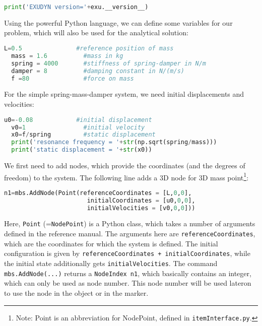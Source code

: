 \begin{lstlisting}[language=Python, firstnumber=8]
  print('EXUDYN version='+exu.__version__)
\end{lstlisting}
%
Using the powerful Python language, we can define some variables for our problem, which will also be used for the analytical solution:
\begin{lstlisting}[language=Python, firstnumber=9]
  L=0.5               #reference position of mass
  mass = 1.6          #mass in kg
  spring = 4000       #stiffness of spring-damper in N/m
  damper = 8          #damping constant in N/(m/s)
  f =80               #force on mass
\end{lstlisting}
%
For the simple spring-mass-damper system, we need initial displacements and velocities:
\begin{lstlisting}[language=Python, firstnumber=14]
  u0=-0.08            #initial displacement
  v0=1                #initial velocity
  x0=f/spring         #static displacement
  print('resonance frequency = '+str(np.sqrt(spring/mass)))
  print('static displacement = '+str(x0))
\end{lstlisting}
%
We first need to add nodes, which provide the coordinates (and the degrees of freedom) to the system.
The following line adds a 3D node for 3D mass point\footnote{Note: Point is an abbreviation for NodePoint, defined in \texttt{itemInterface.py}.}:
\begin{lstlisting}[language=Python, firstnumber=19]
  n1=mbs.AddNode(Point(referenceCoordinates = [L,0,0], 
                       initialCoordinates = [u0,0,0], 
                       initialVelocities = [v0,0,0]))
\end{lstlisting}
Here, \texttt{Point} (=\texttt{NodePoint}) is a Python class, which takes a number of arguments defined in the reference manual. The arguments here are \texttt{referenceCoordinates}, which are the coordinates for which the system is defined. The initial configuration is given by \texttt{referenceCoordinates + initialCoordinates}, while the initial state additionally gets \texttt{initialVelocities}.
The command \texttt{mbs.AddNode(...)} returns a \texttt{NodeIndex n1}, which basically contains an integer, which can only be used as node number. This node number will be used lateron to use the node in the object or in the marker.

